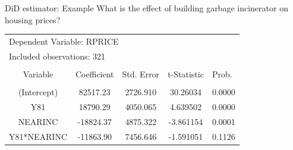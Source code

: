 \documentclass{beamer}
\begin{document}
\begin{frame}{DiD estimator: Example}
\footnotesize{What is the effect of building garbage incinerator on housing prices?}
\scriptsize
\begin{table}[]
\centering
\label{Tab21}
\begin{tabular}{lclcc}
\multicolumn{3}{l}{Dependent Variable: RPRICE}                                          &                      & \multicolumn{1}{l}{}      \\
\multicolumn{3}{l}{Included observations: 321}                                          &                      & \multicolumn{1}{l}{}      \\
                                &                      & \multicolumn{1}{c}{}           &                      & \multicolumn{1}{l}{}      \\
\multicolumn{1}{c}{Variable}    & Coefficient          & \multicolumn{1}{c}{Std. Error} & t-Statistic          & \multicolumn{1}{l}{Prob.} \\
                                
                                & \multicolumn{1}{l}{} &                                & \multicolumn{1}{l}{} & \multicolumn{1}{l}{}      \\
\multicolumn{1}{c}{(Intercept)}           & 82517.23             & \multicolumn{1}{c}{2726.910}   & 30.26034             & 0.0000                    \\
\multicolumn{1}{c}{Y81}         & 18790.29             & \multicolumn{1}{c}{4050.065}   & 4.639502             & 0.0000                    \\
\multicolumn{1}{c}{NEARINC}     & -18824.37            & \multicolumn{1}{c}{4875.322}   & -3.861154            & 0.0001                    \\
\multicolumn{1}{c}{Y81*NEARINC} & -11863.90            & \multicolumn{1}{c}{7456.646}   & -1.591051            & 0.1126                    \\
                                

\end{tabular}
\end{table}
\end{frame}
\end{document}
